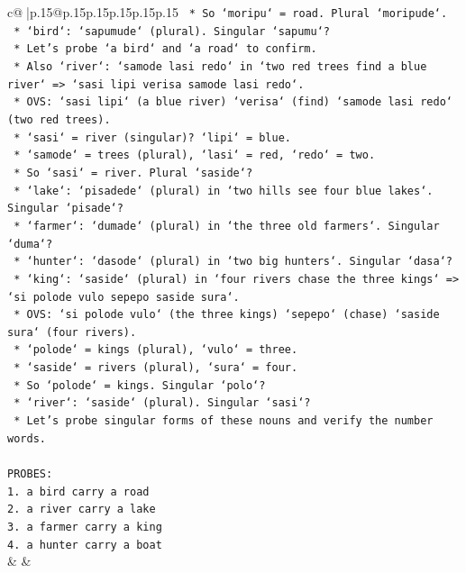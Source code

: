 \documentclass{article}
\begin{document}
{\begin{supertabular}{c@{$\;$}|p{.15\linewidth}@{}p{.15\linewidth}p{.15\linewidth}p{.15\linewidth}p{.15\linewidth}p{.15\linewidth}}
{{{\texttt{        *   So `moripu` = road. Plural `moripude`.} \\
\texttt{        *   `bird`: `sapumude` (plural). Singular `sapumu`?} \\
\texttt{        *   Let's probe `a bird` and `a road` to confirm.} \\
\texttt{        *   Also `river`: `samode lasi redo` in `two red trees find a blue river` => `sasi lipi verisa samode lasi redo`.} \\
\texttt{        *   OVS: `sasi lipi` (a blue river) `verisa` (find) `samode lasi redo` (two red trees).} \\
\texttt{        *   `sasi` = river (singular)? `lipi` = blue.} \\
\texttt{        *   `samode` = trees (plural), `lasi` = red, `redo` = two.} \\
\texttt{        *   So `sasi` = river. Plural `saside`?} \\
\texttt{        *   `lake`: `pisadede` (plural) in `two hills see four blue lakes`. Singular `pisade`?} \\
\texttt{        *   `farmer`: `dumade` (plural) in `the three old farmers`. Singular `duma`?} \\
\texttt{        *   `hunter`: `dasode` (plural) in `two big hunters`. Singular `dasa`?} \\
\texttt{        *   `king`: `saside` (plural) in `four rivers chase the three kings` => `si polode vulo sepepo saside sura`.} \\
\texttt{        *   OVS: `si polode vulo` (the three kings) `sepepo` (chase) `saside sura` (four rivers).} \\
\texttt{        *   `polode` = kings (plural), `vulo` = three.} \\
\texttt{        *   `saside` = rivers (plural), `sura` = four.} \\
\texttt{        *   So `polode` = kings. Singular `polo`?} \\
\texttt{        *   `river`: `saside` (plural). Singular `sasi`?} \\
\texttt{        *   Let's probe singular forms of these nouns and verify the number words.} \\
\\ 
\texttt{PROBES:} \\
\texttt{1. a bird carry a road} \\
\texttt{2. a river carry a lake} \\
\texttt{3. a farmer carry a king} \\
\texttt{4. a hunter carry a boat} \\
            }
        }
    }
    & & \\ \\


\end{supertabular}}
\end{document}
